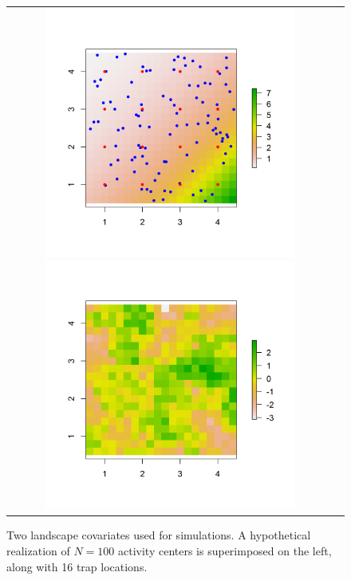 \documentclass[12pt]{article}
\begin{document}
\begin{figure}
\begin{tabular}{cc}
\includegraphics[height=3.25in,width=3.25in]{figs/raster_withN100}
\includegraphics[height=3.25in,width=3.25in]{figs/raster_krige} &
\end{tabular}
\caption{
Two landscape covariates used for simulations. A hypothetical
  realization of $N=100$ activity centers is superimposed on the left,
along with 16 trap locations. 
}
\label{ecoldist.fig.raster100}
\end{figure}




\clearpage

\newpage
\end{document}
